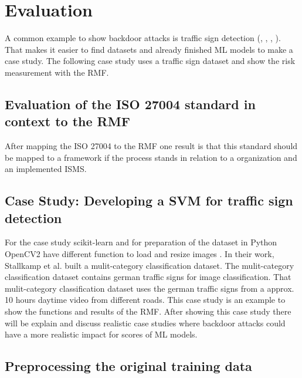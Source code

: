 \section{Evaluation}
\label{sec:evaluation}

A common example to show backdoor attacks is traffic sign detection (\cite{DBLP:journals/corr/abs-2102-10369}, \cite{DBLP:journals/corr/abs-1708-06733}, \cite{DBLP:conf/codaspy/NudingM20}, \cite{DBLP:journals/tdsc/LiXZZZ21}). That makes it easier to find datasets and already finished ML models to make a case study. The following case study uses a traffic sign dataset and show the risk measurement with the RMF.

\subsection{Evaluation of the ISO 27004 standard in context to the RMF}

After mapping the ISO 27004 to the RMF one result is that this standard should be mapped to a framework if the process stands in relation to a organization and an implemented ISMS.

\subsection{Case Study: Developing a SVM for traffic sign detection}

For the case study scikit-learn \cite{scikit-learn} and for preparation of the dataset in Python OpenCV2 have different function to load and resize images \cite{opencv_library}. In their work, Stallkamp et al. \cite{DBLP:conf/ijcnn/StallkampSSI11} built a mulit-category classification dataset. The mulit-category classification dataset contains german traffic signs for image classification. That mulit-category classification dataset uses the german traffic signs from a approx. 10 hours daytime video from different roads.
This case study is an example to show the functions and results of the RMF. After showing this case study there will be explain and discuss realistic case studies where backdoor attacks could have a more realistic impact for scores of ML models.

\subsection{Preprocessing the original training data}

